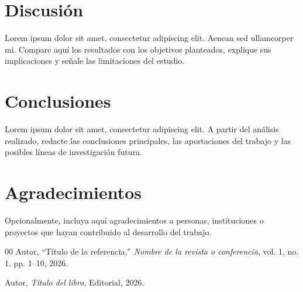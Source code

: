 \documentclass[conference]{IEEEtran}
\begin{document}
\section{Discusión}
Lorem ipsum dolor sit amet, consectetur adipiscing elit. Aenean sed
ullamcorper mi. Compare aquí los resultados con los objetivos planteados,
explique sus implicaciones y señale las limitaciones del estudio.

\section{Conclusiones}
Lorem ipsum dolor sit amet, consectetur adipiscing elit. A partir del
análisis realizado, redacte las conclusiones principales, las aportaciones
del trabajo y las posibles líneas de investigación futura.

\section*{Agradecimientos}
Opcionalmente, incluya aquí agradecimientos a personas, instituciones o
proyectos que hayan contribuido al desarrollo del trabajo.

\begin{thebibliography}{00}
Autor, ``Título de la referencia,'' \textit{Nombre de la revista o
conferencia}, vol. 1, no. 1, pp. 1--10, 2026.

Autor, \textit{Título del libro}, Editorial, 2026.
\end{thebibliography}
\end{document}
